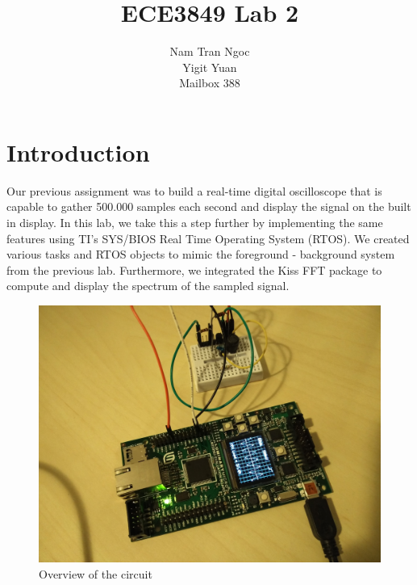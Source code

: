 \documentclass[12pt,oneside,letterpaper]{article}
\title{	ECE3849 Lab 2}
\author{Nam Tran Ngoc\\
		Yigit Yuan\\
    Mailbox 388}
\begin{document}
\maketitle
\cleardoublepage
\section{Introduction}
Our previous assignment was to build a real-time digital oscilloscope that is capable to gather 500.000 samples each second and display the signal on the built in display. In this lab, we take this a step further by implementing the same features using TI’s SYS/BIOS Real Time Operating System (RTOS). We created various tasks and RTOS objects to mimic the foreground - background system from the previous lab. Furthermore, we integrated the Kiss FFT package to compute and display the spectrum of the sampled signal. 

\begin{figure}[h]
  \includegraphics[width=\linewidth]{assets/overview.jpg}
  \caption{Overview of the circuit}
  \label{fig:overview}
\end{figure}
\end{document}
